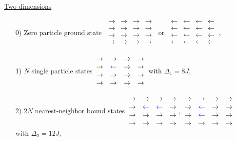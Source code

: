 \noindent \underline{Two dimensions}
\begin{enumerate}
	\item[0)] Zero particle ground state $\: \begin{matrix} \rightarrow & \rightarrow & \rightarrow & \rightarrow \\  \rightarrow & \rightarrow & \rightarrow & \rightarrow \\ \rightarrow & \rightarrow & \rightarrow & \rightarrow \\ \rightarrow & \rightarrow & \rightarrow & \rightarrow \\ \end{matrix} \:$ or $\: \begin{matrix} \leftarrow & \leftarrow & \leftarrow & \leftarrow \\  \leftarrow & \leftarrow & \leftarrow & \leftarrow \\ \leftarrow & \leftarrow & \leftarrow & \leftarrow \\ \leftarrow & \leftarrow & \leftarrow & \leftarrow \\ \end{matrix} \:$,
	\item[1)] $N$ single particle states $\: \begin{matrix} \rightarrow & \rightarrow & \rightarrow & \rightarrow \\  \rightarrow & \textcolor{blue}{\leftarrow} & \rightarrow & \rightarrow \\ \rightarrow & \rightarrow & \rightarrow & \rightarrow \\ \rightarrow & \rightarrow & \rightarrow & \rightarrow \\ \end{matrix} \:$ with $\Delta_1 = 8J$,
	\item[2)] $2N$ nearest-neighbor bound states $\: \begin{matrix} \rightarrow & \rightarrow & \rightarrow & \rightarrow \\  \rightarrow & \textcolor{blue}{\leftarrow} & \textcolor{blue}{\leftarrow} & \rightarrow \\ \rightarrow & \rightarrow & \rightarrow & \rightarrow \\ \rightarrow & \rightarrow & \rightarrow & \rightarrow \\ \end{matrix} \:$, $\: \begin{matrix} \rightarrow & \rightarrow & \rightarrow & \rightarrow \\  \rightarrow & \textcolor{blue}{\leftarrow} & \rightarrow & \rightarrow \\ \rightarrow & \textcolor{blue}{\leftarrow} & \rightarrow & \rightarrow \\ \rightarrow & \rightarrow & \rightarrow & \rightarrow \\ \end{matrix} \:$ with $\Delta_2 = 12J$,

\end{enumerate}
